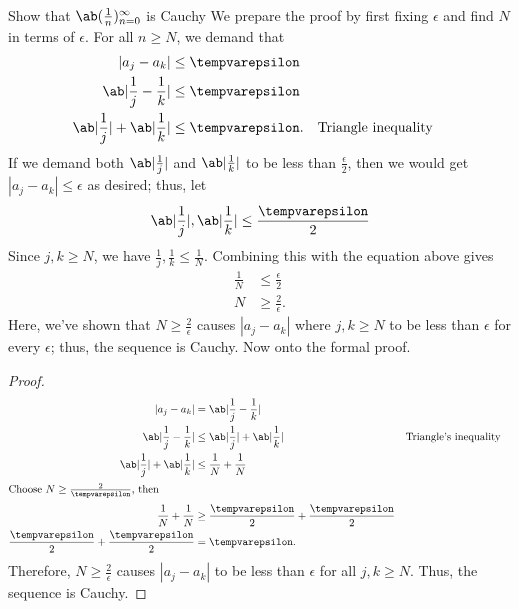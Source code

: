 \begin{exmp}{Show that $\sequence{\frac{1}{n}}{n = 0}{\infty}$ is Cauchy}{}
  We prepare the proof by first fixing $\epsilon$ and find $N$ in terms of $\epsilon$.
  For all $n \geq N$, we demand that
  \begin{align}
    |a_j - a_k|                         & \leq \epsilon                                    \\
    \ab|\frac{1}{j} - \frac{1}{k}|      & \leq \epsilon                                    \\
    \ab|\frac{1}{j}| + \ab|\frac{1}{k}| & \leq \epsilon. &  & \textrm{Triangle inequality}
  \end{align}
  If we demand both $\ab|\frac{1}{j}|$ and $\ab|\frac{1}{k}|$ to be less than
  $\frac{\epsilon}{2}$, then we would get $|a_j - a_k| \leq \epsilon$ as desired; thus, let
  \begin{equation}
    \ab|\frac{1}{j}|, \ab|\frac{1}{k}| \leq \frac{\epsilon}{2}
  \end{equation}
  Since $j, k \geq N$, we have $\frac{1}{j}, \frac{1}{k} \leq \frac{1}{N}$. Combining
  this with the equation above gives
  \begin{align}
    \frac{1}{N} & \leq \frac{\epsilon}{2}  \\
    N           & \geq \frac{2}{\epsilon}.
  \end{align}
  Here, we've shown that $N \geq \frac{2}{\epsilon}$ causes $|a_j - a_k|$ where
  $j, k \geq N$ to be less than $\epsilon$ for every $\epsilon$; thus, the sequence is
  Cauchy. Now onto the formal proof.

  \begin{proof}
    \begin{align}
      |a_j - a_k|                             & = \ab|\frac{1}{j} - \frac{1}{k}|                                                 \\
      \ab|\frac{1}{j} - \frac{1}{k}|          & \leq \ab|\frac{1}{j}| + \ab|\frac{1}{k}|     &  & \textrm{Triangle's inequality} \\
      \ab|\frac{1}{j}| + \ab|\frac{1}{k}|     & \leq \frac{1}{N} + \frac{1}{N}                                                   \\
      \shortintertext{Choose $N \geq \frac{2}{\epsilon}$, then}
      \frac{1}{N} + \frac{1}{N}               & \geq \frac{\epsilon}{2} + \frac{\epsilon}{2}                                     \\
      \frac{\epsilon}{2} + \frac{\epsilon}{2} & = \epsilon.
    \end{align}
    Therefore, $N \geq \frac{2}{\epsilon}$ causes $|a_j - a_k|$ to be less than $\epsilon$
    for all $j, k \geq N$. Thus, the sequence is Cauchy.
  \end{proof}
\end{exmp}

